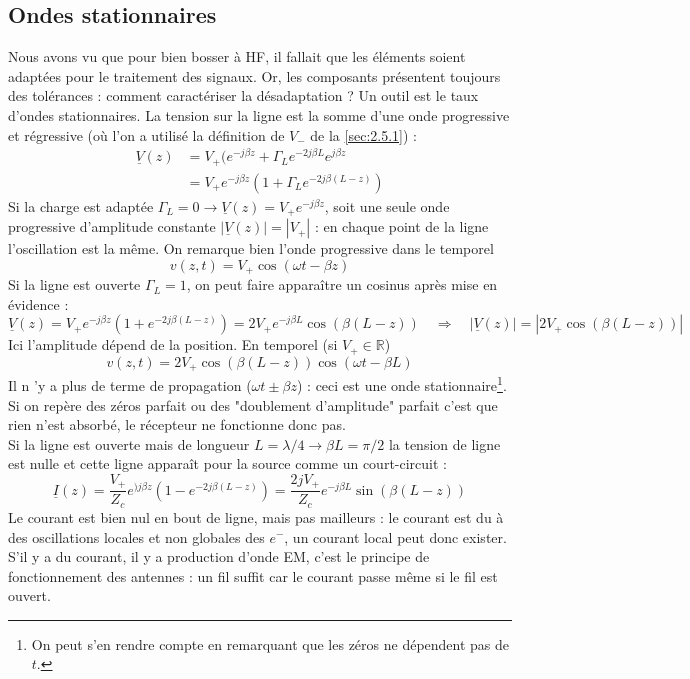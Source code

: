 	\subsection{Ondes stationnaires}
	Nous avons vu que pour bien bosser à HF, il fallait que les éléments soient adaptées pour le 
	traitement des signaux. Or, les composants présentent toujours des tolérances : comment 
	caractériser la désadaptation ? Un outil est le taux d'ondes stationnaires. La tension sur 
	la ligne est la somme d'une onde progressive et régressive (où l'on a utilisé la définition 
	de $V_-$ de la \autoref{sec:2.5.1}) :
	\begin{equation}
	\begin{array}{ll}
	\underline{V}(z) &= V_+(e^{-j\beta z} + \Gamma_L e^{-2j\beta L}e^{j\beta z}\\
	&= V_+e^{-j\beta z}(1+\Gamma_Le^{-2j\beta(L-z)})
	\end{array}
	\end{equation}
	Si la charge est adaptée $\Gamma_L = 0 \rightarrow \underline{V}(z) = V_+e^{-j\beta z}$, 
	soit une seule onde progressive d'amplitude constante $|\underline{V}(z)|=|V_+|$ : en 
	chaque point de la ligne l'oscillation est la même. On remarque bien l'onde progressive 
	dans le temporel
	\begin{equation}
	v(z,t) = V_+\cos(\omega t-\beta z)
	\end{equation}
	Si la ligne est ouverte $\Gamma_L=1$, on peut faire apparaître un cosinus après mise 
	en évidence :
	\begin{equation}
	\underline{V}(z) = V_+e^{-j\beta z}(1+e^{-2j\beta(L-z)}) = 2V_+e^{-j\beta L}\cos(
	\beta(L-z))\quad\Rightarrow\quad |\underline{V}(z)| = |2V_+\cos(\beta(L-z))|
	\end{equation}
	Ici l'amplitude dépend de la position. En temporel (si $V_+\in\mathbb{R}$)
	\begin{equation}
	v(z,t) = 2V_+\cos(\beta(L-z))\cos(\omega t-\beta L)
	\end{equation}
	Il n 'y a plus de terme de propagation ($\omega t \pm \beta z$) : ceci est une onde 
	stationnaire\footnote{On peut s'en rendre compte en remarquant que les zéros ne 
	dépendent pas de $t$.}. Si on repère des zéros parfait ou des "doublement d'amplitude" 
	parfait c'est que rien n'est absorbé, le récepteur ne fonctionne donc pas.\\
	
	\danger Si la ligne est ouverte mais de longueur $L=\lambda/4 \rightarrow \beta L = 
	\pi/2$ la tension de ligne est nulle et cette ligne apparaît pour la source comme un 
	court-circuit :
	\begin{equation}
	\underline{I}(z) = \dfrac{V_+}{Z_c}e^{)j\beta z}(1-e^{-2j\beta(L-z)}) = \dfrac{2jV_+}{
	Z_c}e^{-j\beta L}\sin(\beta(L-z))
	\end{equation}
	Le courant est bien nul en bout de ligne, mais pas mailleurs : le courant est du à 
	des oscillations locales et non globales des $e^-$, un courant local peut donc exister. 
	S'il y a du courant, il y a production d'onde EM, c'est le principe de fonctionnement 
	des antennes : un fil suffit car le courant passe même si le fil est ouvert.\\
	
